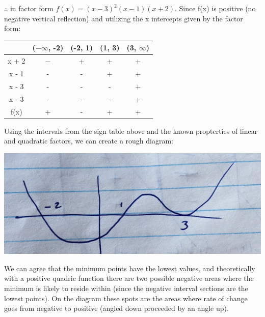 \documentclass[12pt]{book}
\begin{document}
\begin{enumerate}
\newpage

$\therefore$ in factor form $f(x) = {(x-3)}^2(x-1)(x+2)$. Since f(x) is positive 
(no negative vertical reflection) and utilizing the x intercepts given by the factor form:

\begin{center}
    \begin{tabular}{|c|c|c|c|c|}
        \hline
        & ($-\infty$, -2) & (-2, 1) & (1, 3) & (3, $\infty$) \\ \hline
        x + 2 & $-$ & + & + & + \\ \hline
        x - 1 & - & - & + & + \\ \hline
        x - 3 & - & - & - & + \\ \hline
        x - 3 & - & - & - & + \\ \hline
        f(x) & + & - & + & + \\ \hline
    \end{tabular}
\end{center}

Using the intervals from the sign table above and the known propterties 
of linear and quadratic factors, we can create a rough diagram:

\begin{center}
    \includegraphics[scale=0.06]{A2-2 Diagram.jpeg}
\end{center}

\vspace{0.5cm}
We can agree that the minimum points have the lowest values, and theoretically 
with a positive quadric function there are two possible negative areas where the minimum
is likely to reside within (since the negative interval sections are the lowest points). 
On the diagram these spots are the areas where rate of change goes from negative to 
positive (angled down proceeded by an angle up).

\vspace{1cm}


\end{enumerate}
\end{document}
